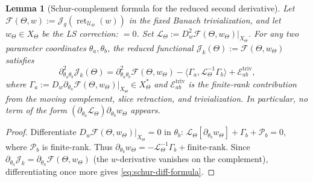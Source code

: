 \documentclass[11pt,reqno,a4paper]{amsart}
\numberwithin{equation}{section}
\theoremstyle{plain}
\newtheorem{lemma}[theorem]{Lemma}
\theoremstyle{remark}
\theoremstyle{plain}
\begin{document}
\begin{lemma}[Schur-complement formula for the reduced second derivative]
\label{lem:schur-diff-reduced}
Let $\mathscr F(\Theta,w):=\mathcal J_g(\operatorname{ret}_{\mathcal U_\Theta}(w))$
in the fixed Banach trivialization, and let $w_\Theta\in X_\Theta$ be the LS
correction: $=0$.  Set
$\mathcal L_\Theta:=D_w^2\mathscr F(\Theta,w_\Theta)|_{X_\Theta}$.
For any two parameter coordinates $\theta_a,\theta_b$, the reduced functional
$\mathcal J_k(\Theta):=\mathscr F(\Theta,w_\Theta)$ satisfies
\begin{equation}\label{eq:schur-diff-formula}
\partial_{\theta_a\theta_b}^2\mathcal J_k(\Theta)
=
\partial_{\theta_a\theta_b}^2\mathscr F(\Theta,w_\Theta)
-
\langle\Gamma_a,\mathcal L_\Theta^{-1}\Gamma_b\rangle
+\mathcal E^{\mathrm{triv}}_{ab},
\end{equation}
where $\Gamma_a:=D_w\partial_{\theta_a}\mathscr F(\Theta,w_\Theta)|_{X_\Theta}
\in X_\Theta^\ast$ and $\mathcal E^{\mathrm{triv}}_{ab}$ is the finite-rank
contribution from the moving complement, slice retraction, and trivialization.
In particular, no term of the form
$(\partial_{\theta_a}\mathcal L_\Theta)\partial_{\theta_b}w_\Theta$ appears.
\end{lemma}

\begin{proof}
Differentiate $D_w\mathscr F(\Theta,w_\Theta)|_{X_\Theta}=0$ in $\theta_b$:
$\mathcal L_\Theta[\partial_{\theta_b}w_\Theta]+\Gamma_b+\mathcal P_b=0$,
where $\mathcal P_b$ is finite-rank.  Thus
$\partial_{\theta_b}w_\Theta=-\mathcal L_\Theta^{-1}\Gamma_b+\text{finite-rank}$.
Since $\partial_{\theta_a}\mathcal J_k=\partial_{\theta_a}\mathscr F(\Theta,w_\Theta)$
(the $w$-derivative vanishes on the complement), differentiating once more
gives \eqref{eq:schur-diff-formula}.
\end{proof}
\end{document}
